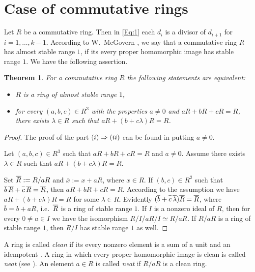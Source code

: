 \documentclass[10pt,a4paper]{amsart}
\theoremstyle{plain}
\newtheorem{theorem}{Theorem}
\theoremstyle{definition}
\begin{document}
\section{Case of commutative rings}

Let $R$ be a commutative  ring. Then in \eqref{Eq:1} each   $d_{i}$ is a divisor of $d_{i+1}$  for $i=1,\ldots, k-1$.  According to
W.~McGovern  \cite[p.\,393]{4-mcGovern}, we say that a commutative ring $R$ has  almost stable range $1$, if its   every proper homomorphic image has stable range $1$. We have   the following assertion.

\begin{theorem}\label{T:4}
For  a commutative ring $R$ the following statements are equivalent:
\begin{itemize}
      \item[(i)] $R$ is a ring of almost stable range $1$,
      \item[(ii)] for every $(a,b,c)\in R^3$ with the properties  $a\ne0$ and $aR+bR+cR=R$,  there exists  $\lambda\in R$ such that $aR+(b+c\lambda)R=R$.
    \end{itemize}
\end{theorem}

\begin{proof}
The proof of the  part $\textsl{(i)} \Rightarrow \textsl{(ii)}$  can be found in \cite[Theorem~3.6]{4-mcGovern} putting  $a\ne 0$.

Let $(a,b,c)\in R^3$ such that  $aR+bR+cR=R$ and $a\ne0$. Assume  there exists  $\lambda\in R$ such that $aR+(b+c\lambda)R=R$.


Set  $\overline{R\vphantom{b}}:=R/aR$ and $\overline{x}:=x+aR$, where $x\in R$. If $(b,c)\in R^2$ such that
$\overline{b}\,\overline{R\vphantom{b}}+\overline{c\vphantom{b}}\,\overline{R\vphantom{b}}=\overline{R\vphantom{b}}$,
then $aR+bR+cR=R$. According to the assumption
we have $aR+(b+c\lambda)R=R$ for some $\lambda\in R$.
Evidently $(\overline{b}+\overline{c\vphantom{b}}\,\overline{\lambda})\overline{R\vphantom{b}}=\overline{R\vphantom{b}}$,
where $\overline{b}=b+aR$, i.e.~$\overline{R\vphantom{b}}$ is a ring of stable range $1$. If $I$ is a nonzero ideal of $R$, then for every  $0\not=a\in I$ we have the isomorphism $R/I\big /aR/I\simeq  R/aR$. If $R/aR$ is a ring of stable range $1$, then  $R/I$ has  stable range $1$ as well.
\end{proof}

A ring  is called {\it clean} if its every    nonzero element   is  a sum of a unit and an idempotent \cite{Nicholson_77}.
A ring  in  which every  proper homomorphic image is clean   is called {\it neat} (see \cite[p.\,248]{6-mcGovern}).
An element $a\in R$ is called  {\it neat} if $R/aR$ is a clean ring.
\end{document}
